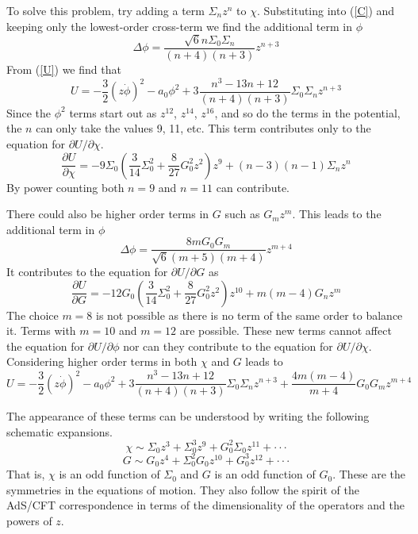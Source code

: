 \documentclass[aps,prd,12pt,nofootinbib]{revtex4}
\newcommand{\be}{\begin{equation}}
\newcommand{\ee}{\end{equation}}
\newcommand{\bd}{\begin{displaymath}}
\newcommand{\ed}{\end{displaymath}}
\def\tthalf{{\textstyle{\frac{3}{2}}}}
\def\phidot{\dot{\phi}}
\def\rt6{\sqrt{6}}
\begin{document}
To solve this problem, try adding a term $\Sigma_n z^n$ to $\chi$.  
Substituting into (\ref{C}) and keeping only the lowest-order cross-term we find the additional term in $\phi$
\be
\Delta \phi = \frac{\rt6 n \Sigma_0 \Sigma_n}{(n+4)(n+3)} z^{n+3}
\ee
From (\ref{U}) we find that
\be
U = -\tthalf (z\phidot)^2 - a_0\phi^2 +3 \frac{n^3 -13n +12}{(n+4)(n+3)} \Sigma_0 \Sigma_n z^{n+3}
\ee
Since the $\phi^2$ terms start out as $z^{12}$, $z^{14}$, $z^{16}$, and so do the terms in the potential, the $n$ can only take the values 9, 11, etc.  
This term contributes only to the equation for $\partial U/\partial \chi$.
\be
\frac{\partial U}{\partial \chi} = -9\Sigma_0 \left( \frac{3}{14} \Sigma_0^2 + \frac{8}{27} G_0^2 z^2 \right) z^9 + (n-3)(n-1) \Sigma_n z^n
\ee
By power counting both $n=9$ and $n=11$ can contribute.  

There could also be higher order terms in $G$ such as $G_m z^m$.  
This leads to the additional term in $\phi$
\be
\Delta \phi = \frac{8 m G_0 G_m}{\rt6 (m+5)(m+4)} z^{m+4}
\ee
It contributes to the equation for $\partial U/\partial G$ as
\be
\frac{\partial U}{\partial G} = -12G_0 \left( \frac{3}{14} \Sigma_0^2 + \frac{8}{27} G_0^2 z^2 \right) z^{10}
+ m (m-4) G_n z^m
\ee
The choice $m=8$ is not possible as there is no term of the same order to balance it.  
Terms with $m=10$ and $m=12$ are possible.  
These new terms cannot affect the equation for $\partial U/\partial \phi$  nor can they contribute to the equation for $\partial U/\partial \chi$.  
Considering higher order terms in both $\chi$ and $G$ leads to
\be
U = -\tthalf (z\phidot)^2 - a_0\phi^2 +3 \frac{n^3 -13n +12}{(n+4)(n+3)} \Sigma_0 \Sigma_n z^{n+3}
+ \frac{4m(m-4)}{m+4} G_0 G_m z^{m+4}
\ee 

The appearance of these terms can be understood by writing the following schematic expansions.
\bd
\chi \sim \Sigma_0 z^3 + \Sigma_0^3 z^9 + G_0^2 \Sigma_0 z^{11} + \cdot\cdot\cdot
\ed
\bd
G \sim G_0 z^4 + \Sigma_0^2 G_0 z^{10} + G_0^3 z^{12} + \cdot\cdot\cdot
\ed
That is, $\chi$ is an odd function of $\Sigma_0$ and $G$ is an odd function of $G_0$.  
These are the symmetries in the equations of motion.  
They also follow the spirit of the AdS/CFT correspondence in terms of the dimensionality of the operators and the powers of $z$.
\end{document}
